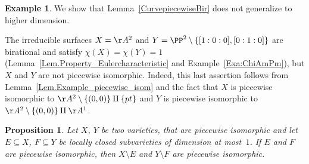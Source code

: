 \documentclass[JEP,XML,SOM,Unicode,NoFloatCountersInSection,published]{cedram}
\newtheorem{proposition}[lemma]{Proposition}
\theoremstyle{definition}
\newtheorem{example}[lemma]{Example}
\begin{document}
\begin{example}\label{A2P2minus}
We show that Lemma~\ref{CurvepiecewiseBir} does not generalize to higher dimension.

The irreducible surfaces $X=\AA^2$ and $Y=\PP^2\setminus \{[1:0:0],[0:1:0]\}$ are birational and satisfy $\chi(X)=\chi(Y)=1$ (Lemma~\ref{Lem.Property_Eulercharacteristic} and Example~\ref{Exa:ChiAmPm}), but $X$ and $Y$ are not piecewise isomorphic. Indeed, this last assertion follows from Lemma~\ref{Lem.Example_piecewise_isom}
and the fact that $X$ is piecewise isomorphic to $\AA^2 \setminus \{(0, 0)\} \amalg \{pt\}$ and
$Y$ is piecewise isomorphic to $\AA^2 \setminus \{(0, 0)\} \amalg \AA^1$.
\end{example}
\begin{proposition}\label{prop:ComplementsCurves}
Let $X$, $Y$ be two varieties, that are piecewise isomorphic and let $E\subseteq X$, $F\subseteq Y$ be locally closed subvarieties of dimension at most~$1$. If $E$ and $F$ are piecewise isomorphic, then $X\setminus E$ and $Y\setminus F$ are piecewise isomorphic.
\end{proposition}
\end{document}
